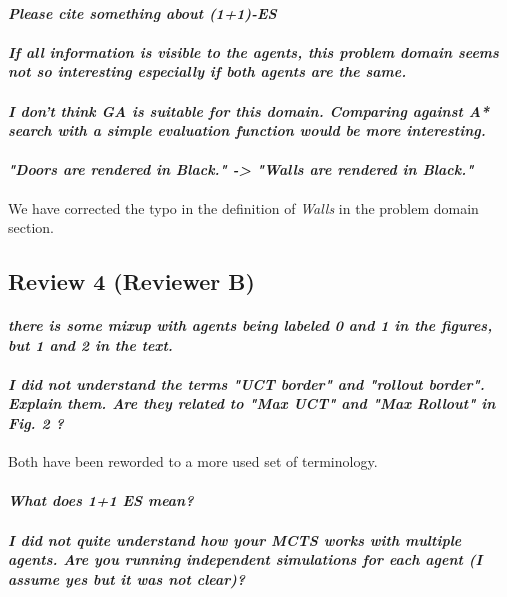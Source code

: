 \documentclass{article}
\begin{document}
\paragraph*{\textit{Please cite something about (1+1)-ES}}
\paragraph*{\textit{If all information is visible to the agents,
this problem domain seems not so interesting especially if
both agents are the same.}}
\paragraph*{\textit{I don't think GA is suitable for this domain.
Comparing against A* search with a simple evaluation function would be more interesting.}}

\paragraph*{\textit{"Doors are rendered in Black." -> "Walls are rendered in Black."}}
We have corrected the typo in the definition of \emph{Walls} in the problem domain section.
\subsection{Review 4 (Reviewer B)}
\paragraph*{\textit{there is some mixup with agents being labeled 0 and 1 in the figures, but 1 and 2 in the text.}}

\paragraph*{\textit{I did not understand the terms "UCT border" and "rollout border". Explain them. Are they related to "Max UCT" and "Max Rollout" in Fig. 2 ?}}
Both have been reworded to a more used set of terminology.
\paragraph*{\textit{What does 1+1 ES mean?}}
\paragraph*{\textit{I did not quite understand how your MCTS works with multiple agents. Are you running independent simulations for each agent (I assume yes but it was not clear)? }}
\end{document}
